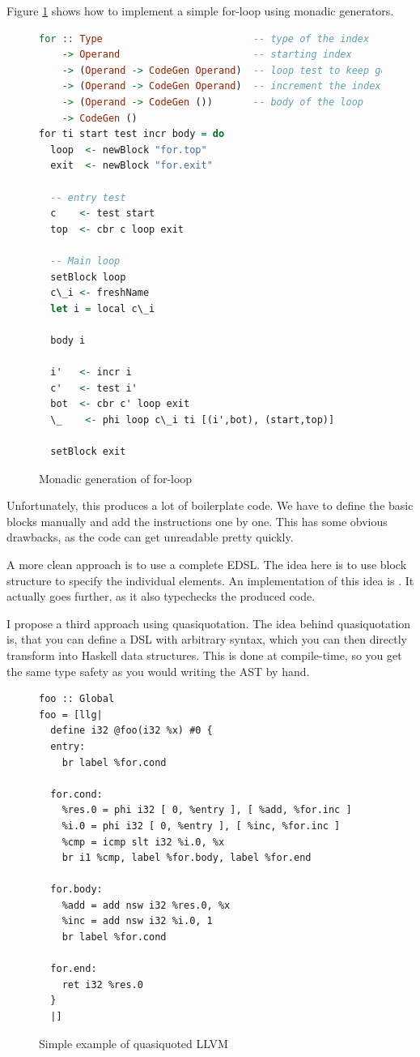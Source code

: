 \documentclass[a4paper,bibliography=totocnumbered,parskip,headsepline]{scrbook}
\begin{document}
Figure \ref{fig:formonad} shows how to implement a simple for-loop using monadic generators.
\begin{figure}
\begin{lstlisting}[language=haskell]
for :: Type                          -- type of the index
    -> Operand                       -- starting index
    -> (Operand -> CodeGen Operand)  -- loop test to keep going
    -> (Operand -> CodeGen Operand)  -- increment the index
    -> (Operand -> CodeGen ())       -- body of the loop
    -> CodeGen ()
for ti start test incr body = do
  loop  <- newBlock "for.top"
  exit  <- newBlock "for.exit"

  -- entry test
  c    <- test start
  top  <- cbr c loop exit

  -- Main loop
  setBlock loop
  c\_i <- freshName
  let i = local c\_i

  body i

  i'   <- incr i
  c'   <- test i'
  bot  <- cbr c' loop exit
  \_    <- phi loop c\_i ti [(i',bot), (start,top)]

  setBlock exit
\end{lstlisting}
\caption{Monadic generation of for-loop}
\label{fig:formonad}
\end{figure}

Unfortunately, this produces a lot of boilerplate code.
We have to define the basic blocks manually and add the instructions one by one.
This has some obvious drawbacks, as the code can get unreadable pretty quickly.

A more clean approach is to use a complete EDSL.
The idea here is to use block structure to specify the individual elements.
An implementation of this idea is .
It actually goes further, as it also typechecks the produced code.

I propose a third approach using quasiquotation\cite{mainland2007quote}.
The idea behind quasiquotation is, that you can define a DSL with arbitrary syntax, which you can then directly transform into Haskell data structures.
This is done at compile-time, so you get the same type safety as you would writing the AST by hand.

\begin{figure}[ht]
\begin{lstlisting}
foo :: Global
foo = [llg|
  define i32 @foo(i32 %x) #0 {
  entry:
    br label %for.cond

  for.cond:
    %res.0 = phi i32 [ 0, %entry ], [ %add, %for.inc ]
    %i.0 = phi i32 [ 0, %entry ], [ %inc, %for.inc ]
    %cmp = icmp slt i32 %i.0, %x
    br i1 %cmp, label %for.body, label %for.end

  for.body:
    %add = add nsw i32 %res.0, %x
    %inc = add nsw i32 %i.0, 1
    br label %for.cond

  for.end:
    ret i32 %res.0
  }
  |]
\end{lstlisting}
\caption{Simple example of quasiquoted LLVM}
\label{fig:simplequote}
\end{figure}
\end{document}
